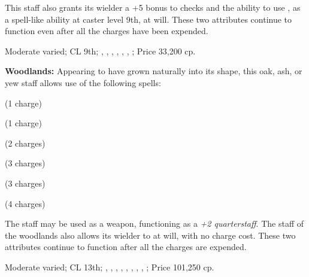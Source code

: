 This staff also grants its wielder a +5 bonus to  checks and the ability to use , as a spell-like ability at caster level 9th, at will. These two attributes continue to function even after all the charges have been expended.

Moderate varied; CL 9th; , , , , , , ; Price 33,200 cp.

\textbf{Woodlands:} Appearing to have grown naturally into its shape, this oak, ash, or yew staff allows use of the following spells:
\begin{itemize*}
\item {} (1 charge)
\item {} (1 charge)
\item {} (2 charges)
\item {} (3 charges)
\item {} (3 charges)
\item {} (4 charges)
\end{itemize*}

The staff may be used as a weapon, functioning as a \emph{+2 quarterstaff}. The staff of the woodlands also allows its wielder to  at will, with no charge cost. These two attributes continue to function after all the charges are expended.

Moderate varied; CL 13th; , , , , , , , , ; Price 101,250 cp. 
